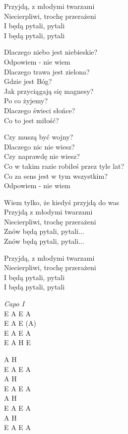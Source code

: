 \begin{text}
    \chordfill
    Przyjdą, z młodymi twarzami\\
    Niecierpliwi, trochę przerażeni\\
    I będą pytali, pytali\\
    I będą pytali, pytali

    Dlaczego niebo jest niebieskie?\\
    Odpowiem - nie wiem\\
    Dlaczego trawa jest zielona?\\
    Gdzie jest Bóg?\\
    Jak przyciągają się magnesy?\\
    Po co żyjemy?\\
    Dlaczego świeci słońce?\\
    Co to jest miłość?

    Czy muszą być wojny?\\
    Dlaczego nic nie wiesz?\\
    Czy naprawdę nie wiesz?\\
    Co w takim razie robiłeś przez tyle lat?\\
    Co za sens jest w tym wszystkim?\\
    Odpowiem - nie wiem

    Wiem tylko, że kiedyś przyjdą do was\\
    Przyjdą z młodymi twarzami\\
    Niecierpliwi, trochę przerażeni\\
    Znów będą pytali, pytali...\\
    Znów będą pytali, pytali...

    Przyjdą, z młodymi twarzami\\
    Niecierpliwi, trochę przerażeni\\
    I będą pytali, pytali\\
    I będą pytali, pytali
\end{text}
\begin{chord}
    \textit{Capo I}\\
    E A E A\\
    E A E (A)\\
    E A E A\\
    E A H E

    A H\\
    E A E A\\
    A H\\
    E A E A\\
    A H\\
    E A E A\\
    A H\\
    E A E A
\end{chord}